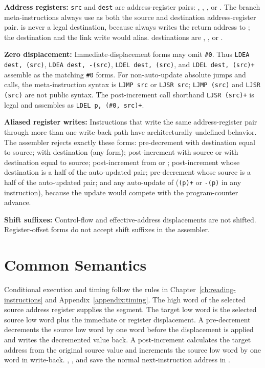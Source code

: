 \noindent\textbf{Address registers:} \texttt{src} and \texttt{dest} are address-register pairs: , ,
, or . The branch meta-instructions always use  as both the source and destination address-register
pair.  is never a legal  destination, because  always writes the return address to
; the destination and the link write would alias.  destinations are , , or .

\noindent\textbf{Zero displacement:} Immediate-displacement forms may omit \texttt{\#0}. Thus
\texttt{LDEA dest, (src)}, \texttt{LDEA dest, -(src)}, \texttt{LDEL dest, (src)}, and
\texttt{LDEL dest, (src)+} assemble as the matching \texttt{\#0} forms. For non-auto-update absolute jumps and calls,
the meta-instruction syntax is \texttt{LJMP src} or \texttt{LJSR src}; \texttt{LJMP (src)} and \texttt{LJSR (src)} are
not public syntax. The post-increment call shorthand \texttt{LJSR (src)+} is legal and assembles as
\texttt{LDEL p, (\#0, src)+}.

\noindent\textbf{Aliased register writes:} Instructions that write the same address-register pair through more than one
write-back path have architecturally undefined behavior. The assembler rejects exactly these forms: 
pre-decrement with destination equal to source;  with destination  (any form); 
post-increment with source  or with destination equal to source;  post-increment from  or
;  post-increment whose destination is a half of the auto-updated pair; 
pre-decrement whose source is a half of the auto-updated pair; and any auto-update of  (\texttt{(p)+} or
\texttt{-(p)} in any instruction), because the update would compete with the program-counter advance.

\noindent\textbf{Shift suffixes:} Control-flow and effective-address displacements are not shifted. Register-offset
forms do not accept shift suffixes in the assembler.

\section{Common Semantics}

Conditional execution and timing follow the rules in Chapter~\ref{ch:reading-instructions} and
Appendix~\ref{appendix:timing}. The high word of the selected source address register supplies the segment. The target
low word is the selected source low word plus the immediate or register displacement. A pre-decrement 
decrements the source low word by one word before the displacement is applied and writes the decremented value back. A
post-increment  calculates the target address from the original source value and increments the source
low word by one word in write-back. , , and  save the normal
next-instruction address in .

